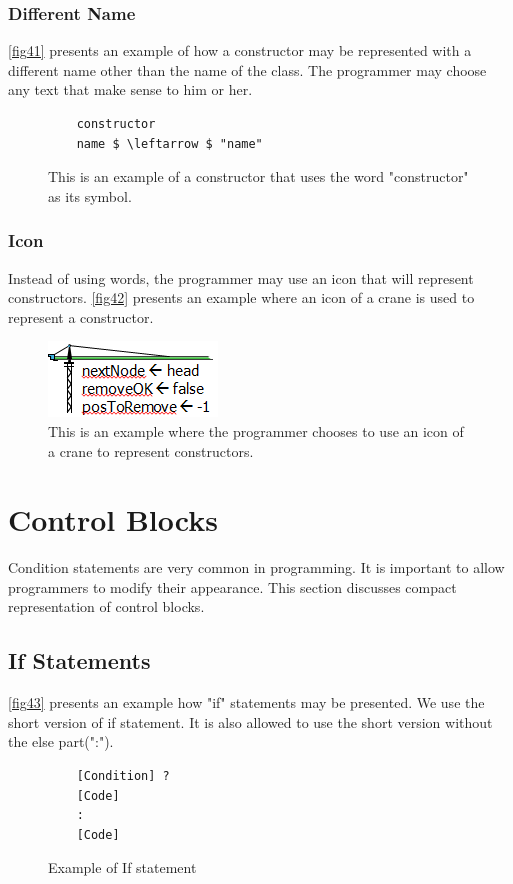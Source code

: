 \subsubsection{Different Name}
\autoref{fig41} presents an example of how a constructor may be represented with a different name other than the name of the class. The programmer may choose any text that make sense to him or her.
\begin{figure}[H]
	\begin{lstlisting}
	constructor
	name $ \leftarrow $ "name"
	\end{lstlisting}
	\caption{This is an example of a constructor that uses the word "constructor" as its symbol.}
	\label{fig41}
\end{figure}
\subsubsection{Icon}
Instead of using words, the programmer may use an icon that will represent constructors. \autoref{fig42} presents an example where an icon of a crane is used to represent a constructor.
\begin{figure}[H]
	\includegraphics{"./fig/Crane Constructor"}
	\caption{This is an example where the programmer chooses to use an icon of a crane to represent constructors.}
	\label{fig42}
\end{figure}
\section{Control Blocks}
Condition statements are very common in programming. It is important to allow programmers to modify their appearance. This section discusses compact representation of control blocks.
\subsection{If Statements}
\autoref{fig43} presents an example how "if" statements may be presented. We use the short version of if statement. It is also allowed to use the short version without the else part(":").
\begin{figure}[H]
	\begin{lstlisting}
	[Condition] ?
	[Code]
	:
	[Code]
	\end{lstlisting}
	\caption{Example of If statement}
	\label{fig43}
\end{figure}
